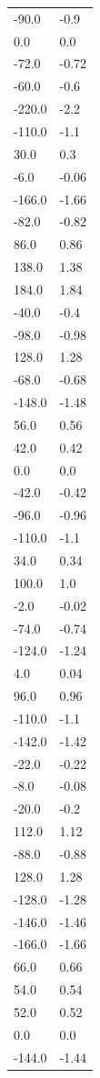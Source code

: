 \begin{longtable}{ll}
-90.0 & -0.9 \\
0.0 & 0.0 \\
-72.0 & -0.72 \\
-60.0 & -0.6 \\
-220.0 & -2.2 \\
-110.0 & -1.1 \\
30.0 & 0.3 \\
-6.0 & -0.06 \\
-166.0 & -1.66 \\
-82.0 & -0.82 \\
86.0 & 0.86 \\
138.0 & 1.38 \\
184.0 & 1.84 \\
-40.0 & -0.4 \\
-98.0 & -0.98 \\
128.0 & 1.28 \\
-68.0 & -0.68 \\
-148.0 & -1.48 \\
56.0 & 0.56 \\
42.0 & 0.42 \\
0.0 & 0.0 \\
-42.0 & -0.42 \\
-96.0 & -0.96 \\
-110.0 & -1.1 \\
34.0 & 0.34 \\
100.0 & 1.0 \\
-2.0 & -0.02 \\
-74.0 & -0.74 \\
-124.0 & -1.24 \\
4.0 & 0.04 \\
96.0 & 0.96 \\
-110.0 & -1.1 \\
-142.0 & -1.42 \\
-22.0 & -0.22 \\
-8.0 & -0.08 \\
-20.0 & -0.2 \\
112.0 & 1.12 \\
-88.0 & -0.88 \\
128.0 & 1.28 \\
-128.0 & -1.28 \\
-146.0 & -1.46 \\
-166.0 & -1.66 \\
66.0 & 0.66 \\
54.0 & 0.54 \\
52.0 & 0.52 \\
0.0 & 0.0 \\
-144.0 & -1.44 \\

\end{longtable}
